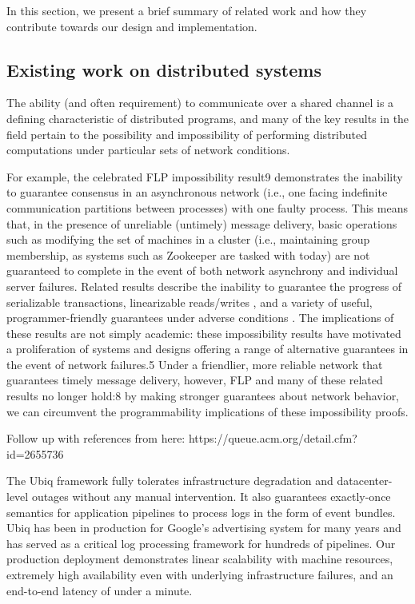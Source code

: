 In this section, we present a brief summary of related work and how they contribute towards
our design and implementation.


\subsection{Existing work on distributed systems}

The ability (and often requirement) to communicate over a shared channel is a defining characteristic of distributed
programs, and many of the key results in the field pertain to the possibility and impossibility of performing
distributed computations under particular sets of network conditions.

For example, the celebrated FLP impossibility result9 demonstrates the inability to guarantee consensus in an
asynchronous network (i.e., one facing indefinite communication partitions between processes) with one faulty process.
This means that, in the presence of unreliable (untimely) message delivery, basic operations such as modifying the set
of machines in a cluster (i.e., maintaining group membership, as systems such as Zookeeper are tasked with today) are
not guaranteed to complete in the event of both network asynchrony and individual server failures. Related results
describe the inability to guarantee the progress of serializable transactions\cite{Davidson1985}, linearizable
reads/writes \cite{Gilbert2002}, and a variety of useful, programmer-friendly guarantees under adverse conditions
\cite{Bailis2013}. The implications of these results are not simply academic: these impossibility results have motivated
a proliferation of systems and designs offering a range of alternative guarantees in the event of network failures.5
Under a friendlier, more reliable network that guarantees timely message delivery, however, FLP and many of these
related results no longer hold:8 by making stronger guarantees about network behavior, we can circumvent the
programmability implications of these impossibility proofs.

Follow up with references from here: https://queue.acm.org/detail.cfm?id=2655736

The Ubiq \cite{ubiq}framework fully tolerates infrastructure degradation and datacenter-level outages without any manual
intervention. It also guarantees exactly-once semantics for application pipelines to process logs in the form of event
bundles. Ubiq has been in production for Google’s advertising system for many years and has served as a critical log
processing framework for hundreds of pipelines. Our production deployment demonstrates linear scalability with machine
resources, extremely high availability even with underlying infrastructure failures, and an end-to-end latency of under
a minute.
